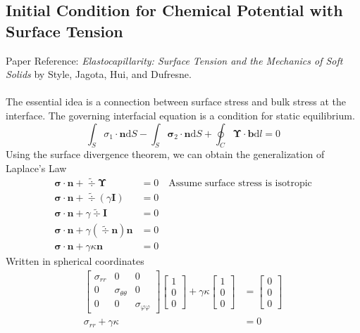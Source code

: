 \documentclass[12pt,3p]{article}
\numberwithin{equation}{section}
\begin{document}
\subsection{Initial Condition for Chemical Potential with Surface Tension}
\vspace{-1ex}
Paper Reference: \textit{Elastocapillarity: Surface Tension and the Mechanics of Soft Solids} by Style, Jagota, Hui, and Dufresne. \\ \\
The essential idea is a connection between surface stress and bulk stress at the interface. The governing interfacial equation is a condition for static equilibrium. 
\begin{equation*}
\int_{S} \sigma_{1} \cdot \mathbf{n} \mathrm{d} S-\int_{S} \boldsymbol{\sigma}_{2} \cdot \mathbf{n} \mathrm{d} S+\oint_{C} \mathbf{\Upsilon} \cdot \mathbf{b} \mathrm{d} l=0
\end{equation*}
Using the surface divergence theorem, we can obtain the generalization of Laplace's Law
\begin{align*}
\boldsymbol{\sigma} \cdot \mathbf{n} + \tilde{\div} \boldsymbol{\Upsilon} &= 0 \quad \text{Assume surface stress is isotropic} \\
\boldsymbol{\sigma} \cdot \mathbf{n} + \tilde{\div} (\gamma \mathbf{I}) &= 0 \\
\boldsymbol{\sigma} \cdot \mathbf{n} + \gamma \tilde{\div} \mathbf{I} &= 0 \\
\boldsymbol{\sigma} \cdot \mathbf{n} + \gamma (\tilde{\div} \mathbf{n}) \mathbf{n} &= 0 \\
\boldsymbol{\sigma} \cdot \mathbf{n} + \gamma \kappa \mathbf{n} &= 0 
\end{align*}
Written in spherical coordinates
\begin{align*}
\begin{bmatrix}
\sigma_{rr} & 0 				       & 0 \\
0		  & \sigma_{\theta \theta} & 0 \\
0		  & 0 				       & \sigma_{\varphi \varphi} 
\end{bmatrix}
\begin{bmatrix}
1 \\
0 \\
0
\end{bmatrix} 
+ \gamma \kappa
\begin{bmatrix}
1 \\
0 \\
0
\end{bmatrix} &= 
\begin{bmatrix}
0 \\
0 \\
0
\end{bmatrix} \\
\sigma_{rr} + \gamma \kappa &= 0
\end{align*}
\end{document}

